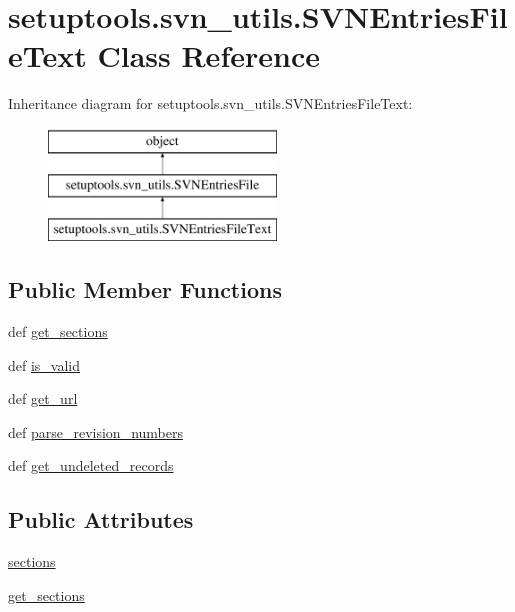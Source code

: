 \hypertarget{classsetuptools_1_1svn__utils_1_1SVNEntriesFileText}{}\section{setuptools.\+svn\+\_\+utils.\+S\+V\+N\+Entries\+File\+Text Class Reference}
\label{classsetuptools_1_1svn__utils_1_1SVNEntriesFileText}
Inheritance diagram for setuptools.\+svn\+\_\+utils.\+S\+V\+N\+Entries\+File\+Text\+:\begin{figure}[H]
\begin{center}
\leavevmode
\includegraphics[height=3.000000cm]{classsetuptools_1_1svn__utils_1_1SVNEntriesFileText}
\end{center}
\end{figure}
\subsection*{Public Member Functions}
\begin{DoxyCompactItemize}
\item 
def \hyperlink{classsetuptools_1_1svn__utils_1_1SVNEntriesFileText_a96004ace4ae2f40a5fdd8432b586f154}{get\+\_\+sections}
\item 
def \hyperlink{classsetuptools_1_1svn__utils_1_1SVNEntriesFileText_ae0578910409ec4cd0c64999233b8b1e6}{is\+\_\+valid}
\item 
def \hyperlink{classsetuptools_1_1svn__utils_1_1SVNEntriesFileText_ae5b36cb0c918cce6f3bb512df156ad1a}{get\+\_\+url}
\item 
def \hyperlink{classsetuptools_1_1svn__utils_1_1SVNEntriesFileText_a4fdc72294d9618542de07e4d8329eb07}{parse\+\_\+revision\+\_\+numbers}
\item 
def \hyperlink{classsetuptools_1_1svn__utils_1_1SVNEntriesFileText_a9f4e2fae84e2cf0dc30803060607d207}{get\+\_\+undeleted\+\_\+records}
\end{DoxyCompactItemize}
\subsection*{Public Attributes}
\begin{DoxyCompactItemize}
\item 
\hyperlink{classsetuptools_1_1svn__utils_1_1SVNEntriesFileText_a149ca4294edfb5a24a10451113c65268}{sections}
\item 
\hyperlink{classsetuptools_1_1svn__utils_1_1SVNEntriesFileText_aaeed30e523e4dc8f88fd76f391ce545a}{get\+\_\+sections}
\end{DoxyCompactItemize}
